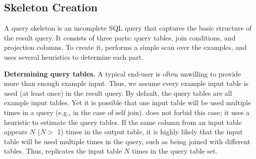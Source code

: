 \subsection{Skeleton Creation}
\label{sec:skeleton}



A query skeleton is an incomplete SQL query
that captures the basic structure of the result query.
It consists of three parts: query tables,
join conditions, and projection columns.
To create it, \ourtool performs a simple scan over
the examples, and uses several heuristics to determine
each part.



\vspace{1mm}
{\textbf{Determining query tables.}} 
A typical end-user is often unwilling to provide more than enough
example input. Thus, we assume every example input table
is used (at least once) in the result query.
By default, the query tables are all example input tables.
Yet it is possible that one input table will be
used multiple times in a query (e.g., in the case of
self join). \ourtool does not forbid this case;
it uses a heuristic to estimate the query tables.
If the same column from an input table appears $N$ ($N >$ 1) times in the
output table, it is highly likely that the input table
will be used multiple times in the query, such
as being joined with different tables.
Thus, \ourtool replicates the input table $N$ times in
the query table set.




